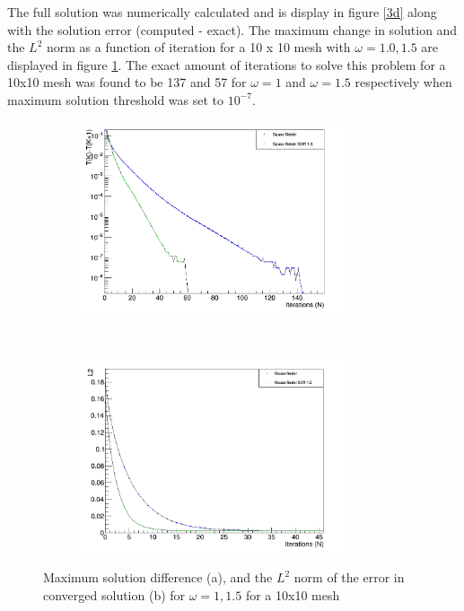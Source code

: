 \documentclass[paper=a4, fontsize=11pt, abstract=on]{scrartcl}
\numberwithin{equation}{section}		%
\numberwithin{figure}{section}			%
\numberwithin{table}{section}				%
\begin{document}
The full solution was numerically calculated and is display in figure \ref{3d} along with the solution error (computed - exact). The maximum change in solution and the $L^2$ norm as a function of iteration for a 10 x 10 mesh with $\omega = 1.0,1.5$ are displayed in figure \ref{q34}.  The exact amount of iterations to solve this problem for a 10x10 mesh was found to be 137 and 57 for $\omega = 1$ and $\omega = 1.5$ respectively when maximum solution threshold was set to $10^{-7}$. 


\begin{figure}[H]
        \centering
        \begin{subfigure}[h]{0.5\textwidth}
                \includegraphics[width = 8.0cm]{conv}
                \caption{}
				
        \end{subfigure}%
       ~~~~~
        \begin{subfigure}[h]{0.5\textwidth}
                \includegraphics[width = 8.0cm]{l2con}
                \caption{}
                
        \end{subfigure}
        \caption{Maximum solution difference (a), and the $L^2$ norm of the error in converged solution (b) for $\omega = 1, 1.5$ for a 10x10 mesh }
        \label{q34}
\end{figure}
\end{document}
